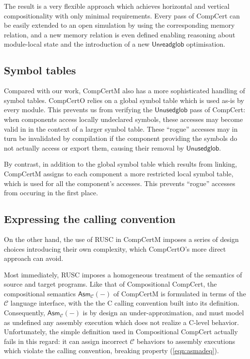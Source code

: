 \documentclass[sigplan,10pt,review]{acmart}
\newcommand{\kw}[1]{\ensuremath{ \mathsf{#1} }}
\begin{document}
The result is a very flexible approach
which achieves horizontal and vertical compositionality
with only minimal requirements.
Every pass of CompCert can be easily
extended to an open simulation
by using the corresponding memory relation,
and a new memory relation is even defined
enabling reasoning about module-local state
and the introduction of a new \kw{Unreadglob} optimisation.


\subsection{Symbol tables} %

Compared with our work,
CompCertM also has a more sophisticated handling
of symbol tables.
CompCertO relies on a global symbol table
which is used as-is by every module.
This prevents us
from verifying the \kw{Unusedglob} pass of CompCert:
when components access locally undeclared symbols,
these accesses may become valid in
in the context of a larger symbol table.
These ``rogue'' accesses may in turn be invalidated by compilation
if the component providing the symbols
do not actually access or export them,
causing their removal by \kw{Unusedglob}.

By contrast,
in addition to the global symbol table which results from linking,
CompCertM assigns to each component
a more restricted local symbol table,
which is used for all the component's accesses.
This prevents ``rogue'' accesses
from occuring in the first place.


\subsection{Expressing the calling convention} %

On the other hand,
the use of RUSC in CompCertM imposes a series of design choices
introducing their own complexity,
which CompCertO's more direct approach can avoid.

Most immediately,
RUSC imposes a homogeneous
treatment of the semantics of source and target programs.
Like that of Compositional CompCert,
the compositional semantics $\kw{Asm}_\mathcal{C}(-)$
of CompCertM
is formulated in terms of the $\mathcal{C}$ language interface,
with the the C calling convention built into its definition.
Consequently, $\kw{Asm}_\mathcal{C}(-)$ is by design an under-approximation,
and must model as undefined any assembly execution
which does not realize a C-level behavior.
Unfortunately,
the simple definition used in Compositional CompCert
actually fails in this regard:
it can assign incorrect $\mathcal{C}$ behaviors
to assembly executions which violate the calling convention,
breaking property (\ref{eqn:asmadeq}).
\end{document}
